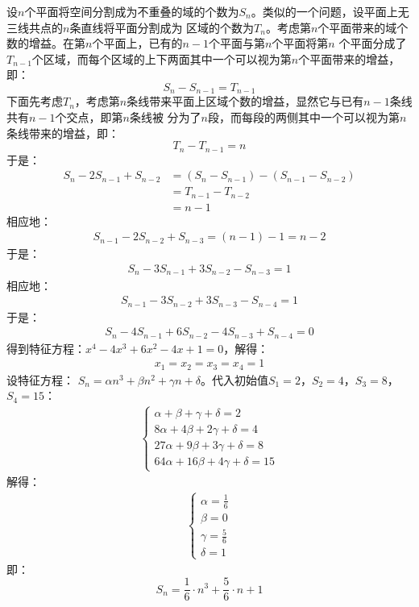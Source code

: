 \begin{solution}
    设$n$个平面将空间分割成为不重叠的域的个数为$S_n$。类似的一个问题，设平面上无三线共点的$n$条直线将平面分割成为
    区域的个数为$T_n$。考虑第$n$个平面带来的域个数的增益。在第$n$个平面上，已有的$n-1$个平面与第$n$个平面将第$n$
    个平面分成了$T_{n-1}$个区域，而每个区域的上下两面其中一个可以视为第$n$个平面带来的增益，即：
    $$S_{n}-S_{n-1}=T_{n-1}$$
    下面先考虑$T_n$，考虑第$n$条线带来平面上区域个数的增益，显然它与已有$n-1$条线共有$n-1$个交点，即第$n$条线被
    分为了$n$段，而每段的两侧其中一个可以视为第$n$条线带来的增益，即：
    $$T_{n}-T_{n-1}=n$$
    于是：
    \begin{align*}
        S_{n}-2S_{n-1}+S_{n-2} &= (S_{n}-S_{n-1}) - (S_{n-1}-S_{n-2})\\
        &= T_{n-1} - T_{n-2} \\
        &= n - 1
    \end{align*}
    相应地：
    \begin{align*}
        S_{n-1}-2S_{n-2}+S_{n-3} = (n-1)-1 = n - 2
    \end{align*}
    于是：
    \begin{align*}
        S_{n}-3S_{n-1}+3S_{n-2}-S_{n-3} = 1
    \end{align*}
    相应地：
    \begin{align*}
        S_{n-1}-3S_{n-2}+3S_{n-3}-S_{n-4} = 1
    \end{align*}
    于是：
    \begin{align*}
        S_{n}-4S_{n-1}+6S_{n-2}-4S_{n-3}+S_{n-4} = 0
    \end{align*}
    得到特征方程：$x^4-4x^3+6x^2-4x+1=0$，解得：
    \begin{align*}
        x_1 = x_2 = x_3 = x_4 = 1
    \end{align*}
    设特征方程：
    $S_n = \alpha n^3+\beta n^2 +\gamma n + \delta$。代入初始值$S_1=2$，$S_2=4$，$S_3=8$，$S_4=15$：
    \begin{align*}
        \begin{cases}
            \alpha + \beta + \gamma + \delta= 2\\
            8\alpha + 4\beta + 2\gamma + \delta= 4\\
            27\alpha + 9\beta + 3\gamma + \delta= 8\\
            64\alpha + 16\beta + 4\gamma + \delta= 15
        \end{cases}
    \end{align*}
    解得：
    \begin{align*}
        \begin{cases}
            \alpha = \frac{1}{6}\\
            \beta = 0\\
            \gamma = \frac{5}{6}\\
            \delta = 1
        \end{cases}
    \end{align*}
    即：
    $$S_n = \frac{1}{6}\cdot n^3 + \frac{5}{6}\cdot n + 1$$
\end{solution}
